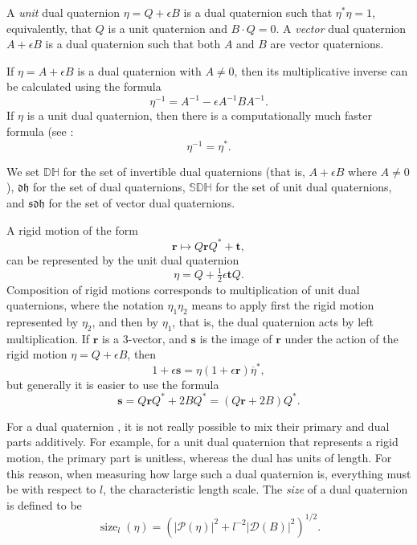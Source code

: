 \documentclass[reqno,12pt]{amsart}
\newcommand\setinvertibledualquat{\mathbb D\mathbb H}
\newcommand\setdualquat{\mathfrak d \mathfrak h}
\newcommand\setunitdualquat{\mathbb S\mathbb D\mathbb H}
\newcommand\setvectordualquat{\mathfrak{s}\mathfrak d \mathfrak h}
\DeclareMathOperator\size{{size}}
\begin{document}
A \emph{unit} dual quaternion $\eta = Q + \epsilon B$ is a dual quaternion such that $\eta^*\eta = 1$, equivalently, that $Q$ is a unit quaternion and $B \cdot Q = 0$.  A \emph{vector} dual quaternion $A + \epsilon B$ is a dual quaternion such that both $A$ and $B$ are vector quaternions.

If $\eta = A + \epsilon B$ is a dual quaternion with $A \ne 0$, then its multiplicative inverse can be calculated using the formula
\begin{equation}
\eta^{-1} = A^{-1} - \epsilon A^{-1} B A^{-1}.
\end{equation}
If $\eta$ is a unit dual quaternion, then there is a computationally much faster formula (see \cite{adorno}:
\begin{equation}
\label{inverse unit}
\eta^{-1} = \eta^*.
\end{equation}

We set $\setinvertibledualquat$ for the set of invertible dual quaternions (that is, $A +\epsilon B$ where $A \ne 0$), $\setdualquat$ for the set of dual quaternions, $\setunitdualquat$ for the set of unit dual quaternions, and $\setvectordualquat$ for the set of vector dual quaternions.

A rigid motion of the form
\begin{equation}
\label{rigid motion action}
\bm r \mapsto Q \bm r Q^* + \bm t,
\end{equation}
can be represented by the unit dual quaternion
\begin{equation}
\label{rigid motion as dual quaternion}
\eta = Q + \tfrac12 \epsilon \bm t Q.
\end{equation}
Composition of rigid motions corresponds to multiplication of unit dual quaternions, where the notation $\eta_1 \eta_2$ means to apply first the rigid motion represented by $\eta_2$, and then by $\eta_1$, that is, the dual quaternion acts by left multiplication.  If $\bm r$ is a 3-vector, and $\bm s$ is the image of $\bm r$ under the action of the rigid motion $\eta = Q + \epsilon B$, then
\begin{equation}
\label{defn of rigid motion on 3-vector}
1 + \epsilon \bm s = \eta (1 + \epsilon \bm r) \overline\eta^* ,
\end{equation}
but generally it is easier to use the formula
\begin{equation}
\label{rigid motion on 3-vector}
\bm s = Q \bm r Q^* + 2 B Q^* = (Q \bm r + 2 B) Q^* .
\end{equation}

For a dual quaternion , it is not really possible to mix their primary and dual parts additively.  For example, for a unit dual quaternion that represents a rigid motion, the primary part is unitless, whereas the dual has units of length.  For this reason, when measuring how large such a dual quaternion is, everything must be with respect to $l$, the characteristic length scale.  The \emph{size} of a dual quaternion is defined to be
\begin{equation}
\label{size}
\size_{l}(\eta) = \left(|\mathcal P(\eta)|^2 + l^{-2}|\mathcal D(B)|^2\right)^{1/2}.
\end{equation}
\end{document}
